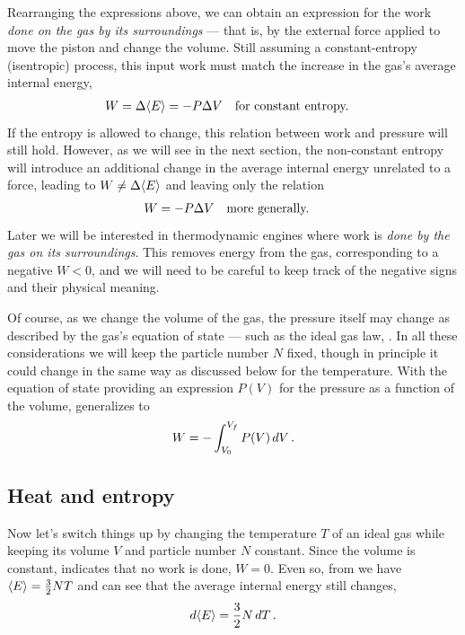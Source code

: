 Rearranging the expressions above, we can obtain an expression for the work \textit{done on the gas by its surroundings} --- that is, by the external force applied to move the piston and change the volume.
Still assuming a constant-entropy (isentropic) process, this input work must match the increase in the gas's average internal energy,
\begin{align*}
  W & = \Delta\!\left\langle E \right\rangle = -P \Delta V & & \mbox{for constant entropy.}
\end{align*}
If the entropy is allowed to change, this relation between work and pressure will still hold.
However, as we will see in the next section, the non-constant entropy will introduce an additional change in the average internal energy unrelated to a force, leading to $W \neq \Delta\!\left\langle E \right\rangle$ and leaving only the relation
\begin{align}
  \label{eq:work_constP}
  W & = -P \Delta V & & \mbox{more generally.}
\end{align}
Later we will be interested in thermodynamic engines where work is \textit{done by the gas on its surroundings}.
This removes energy from the gas, corresponding to a negative $W < 0$, and we will need to be careful to keep track of the negative signs and their physical meaning.

Of course, as we change the volume of the gas, the pressure itself may change as described by the gas's equation of state --- such as the ideal gas law, .
In all these considerations we will keep the particle number $N$ fixed, though in principle it could change in the same way as discussed below  for the temperature.
With the equation of state providing an expression $P(V)$ for the pressure as a function of the volume,  generalizes to
\begin{equation}
  \label{eq:work}
  W = -\int_{V_0}^{V_f} P(V) \mathop{dV}.
\end{equation}



\subsection{Heat and entropy}
Now let's switch things up by changing the temperature $T$ of an ideal gas while keeping its volume $V$ and particle number $N$ constant.
Since the volume is constant,  indicates that no work is done, $W = 0$.
Even so, from  we have $\left\langle E \right\rangle = \frac{3}{2} NT$ and can see that the average internal energy still changes,
\begin{equation}
  \label{eq:dE_dT}
  \mathop{d\!\left\langle E \right\rangle} = \frac{3}{2} N \mathop{dT}.
\end{equation}

